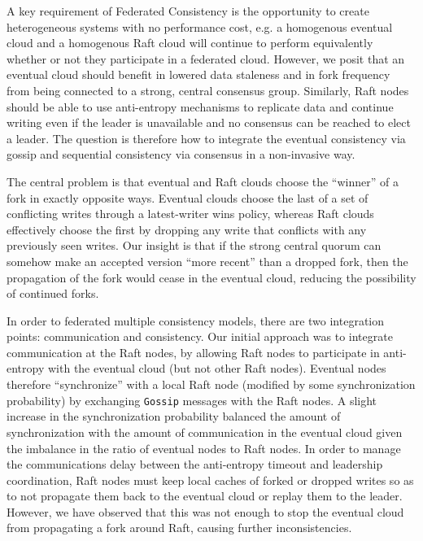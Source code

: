 \documentclass[10pt,conference,letterpaper]{IEEEtran}
\begin{document}
A key requirement of Federated Consistency is the opportunity to create heterogeneous systems with no performance cost, e.g. a homogenous eventual cloud and a homogenous Raft cloud will continue to perform equivalently whether or not they participate in a federated cloud. However, we posit that an eventual cloud should benefit in lowered data staleness and in fork frequency from being connected to a strong, central consensus group. Similarly, Raft nodes should be able to use anti-entropy mechanisms to replicate data and continue writing even if the leader is unavailable and no consensus can be reached to elect a leader. The question is therefore how to integrate the eventual consistency via gossip and sequential consistency via consensus in a non-invasive way.

The central problem is that eventual and Raft clouds choose the ``winner'' of a fork in exactly opposite ways. Eventual clouds choose the last of a set of conflicting writes through a latest-writer wins policy, whereas Raft clouds effectively choose the first by dropping any write that conflicts with any previously seen writes. Our insight is that if the strong central quorum can somehow make an accepted version ``more recent'' than a dropped fork, then the propagation of the fork would cease in the eventual cloud, reducing the possibility of continued forks.

In order to federated multiple consistency models, there are two integration points: communication and consistency. Our initial approach was to integrate communication at the Raft nodes, by allowing Raft nodes to participate in anti-entropy with the eventual cloud (but not other Raft nodes). Eventual nodes therefore ``synchronize'' with a local Raft node (modified by some synchronization probability) by exchanging \texttt{Gossip} messages with the Raft nodes. A slight increase in the synchronization probability balanced the amount of synchronization with the amount of communication in the eventual cloud given the imbalance in the ratio of eventual nodes to Raft nodes. In order to manage the communications delay between the anti-entropy timeout and leadership coordination, Raft nodes must keep local caches of forked or dropped writes so as to not propagate them back to the eventual cloud or replay them to the leader. However, we have observed that this was not enough to stop the eventual cloud from propagating a fork around Raft, causing further inconsistencies.
\end{document}
